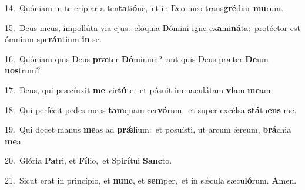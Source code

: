 {\numbfont\textcolor{\numbcolor}{14.}}~Quóniam in te erípiar a ten\-\textbf{ta}\-ti\-\textbf{ó}\-ne,~\star et in Deo meo trans\-\textbf{gré}\-diar \textbf{mu}\-rum.\par
{\numbfont\textcolor{\numbcolor}{15.}}~Deus meus, impollúta via ejus:~\dagger elóquia Dómini igne ex\-\textbf{a}\-mi\-\textbf{ná}\-ta:~\star protéctor est ómnium spe\-\textbf{rán}\-tium \textbf{in} se.\par
{\numbfont\textcolor{\numbcolor}{16.}}~Quóniam quis Deus \textbf{præ}\-ter \textbf{Dó}\-minum?~\star aut quis Deus præter \textbf{De}\-um \textbf{nos}\-trum?\par
{\numbfont\textcolor{\numbcolor}{17.}}~Deus, qui præcínxit \textbf{me} vir\-\textbf{tú}\-te:~\star et pósuit immaculátam \textbf{vi}\-am \textbf{me}\-am.\par
{\numbfont\textcolor{\numbcolor}{18.}}~Qui perfécit pedes meos \textbf{tam}\-quam cer\-\textbf{vó}\-rum,~\star et super excélsa \textbf{stá}\-tu\textbf{ens} me.\par
{\numbfont\textcolor{\numbcolor}{19.}}~Qui docet manus \textbf{me}\-as ad \textbf{prǽ}\-lium:~\star et posuísti, ut arcum ǽreum, \textbf{brá}\-chia \textbf{me}\-a.\par
{\numbfont\textcolor{\numbcolor}{20.}}~Glória \textbf{Pa}\-tri, et \textbf{Fí}\-lio,~\star et Spi\-\textbf{rí}\-tui \textbf{Sanc}\-to.\par
{\numbfont\textcolor{\numbcolor}{21.}}~Sicut erat in princípio, et \textbf{nunc}\-, et \textbf{sem}\-per,~\star et in sǽcula sæcu\-\textbf{ló}\-rum. \textbf{A}\-men.\par
